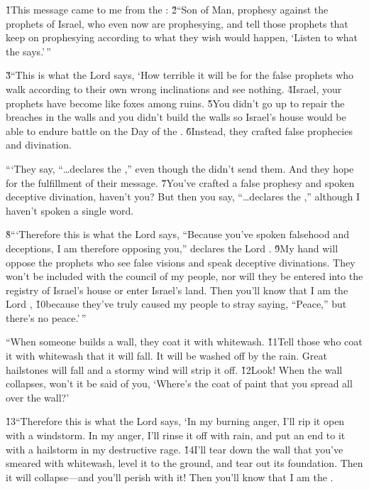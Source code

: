 \v{1}This message came to me from the : \v{2}``Son of Man, prophesy against the prophets of Israel, who even now are prophesying, and tell those prophets that keep on prophesying according to what they wish would happen, `Listen to what the  says.'\,''

\v{3}``This is what the Lord  says, `How terrible it will be for the false prophets who walk according to their own wrong inclinations and see nothing. \v{4}Israel, your prophets have become like foxes among ruins. \v{5}You didn't go up to repair the breaches in the walls and you didn't build the walls so Israel's house would be able to endure battle on the Day of the . \v{6}Instead, they crafted false prophecies and divination.

```They say, ``{\ldots}declares the ,'' even though the  didn't send them. And they hope for the fulfillment of their message. \v{7}You've crafted a false prophesy and spoken deceptive divination, haven't you? But then you say, ``{\ldots}declares the ,'' although I haven't spoken a single word.

\v{8}```Therefore this is what the Lord  says, ``Because you've spoken falsehood and deceptions, I am therefore opposing you,'' declares the Lord . \v{9}My hand will oppose the prophets who see false visions and speak deceptive divinations. They won't be included with the council of my people, nor will they be entered into the registry of Israel's house or enter Israel's land. Then you'll know that I am the Lord , \v{10}because they've truly caused my people to stray saying, ``Peace,'' but there's no peace.'\,''

``When someone builds a wall, they coat it with whitewash. \v{11}Tell those who coat it with whitewash that it will fall. It will be washed off by the rain. Great hailstones will fall and a stormy wind will strip it off. \v{12}Look! When the wall collapses, won't it be said of you, `Where's the coat of paint that you spread all over the wall?'

\v{13}``Therefore this is what the Lord  says, `In my burning anger, I'll rip it open with a windstorm. In my anger, I'll rinse it off with rain, and put an end to it with a hailstorm in my destructive rage. \v{14}I'll tear down the wall that you've smeared with whitewash, level it to the ground, and tear out its foundation. Then it will collapse---and you'll perish with it! Then you'll know that I am the .

